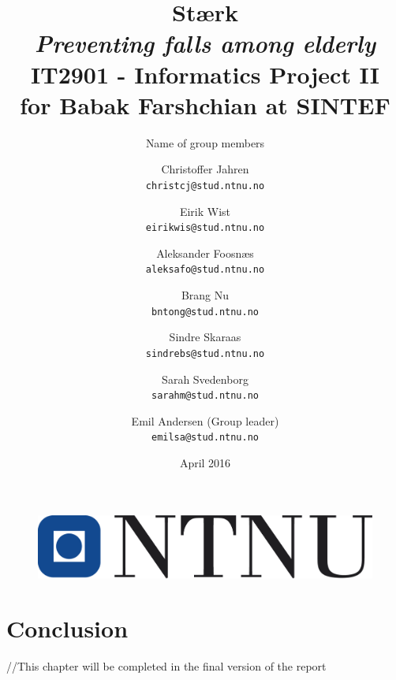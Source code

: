 \documentclass{report}
\title{Stærk \\
\large \textit{Preventing falls among elderly} \\[0.5em] IT2901 - Informatics Project II \\for Babak Farshchian at SINTEF}
\author{Name of group members}
\author{
  Christoffer Jahren\\
  \texttt{christcj@stud.ntnu.no}
  \and
  Eirik Wist\\
  \texttt{eirikwis@stud.ntnu.no}
  \and
  Aleksander Foosnæs\\
  \texttt{aleksafo@stud.ntnu.no}
  \and
  Brang Nu\\
  \texttt{bntong@stud.ntnu.no}
  \and
  Sindre Skaraas\\
  \texttt{sindrebs@stud.ntnu.no}
  \and
  Sarah Svedenborg\\
  \texttt{sarahm@stud.ntnu.no} 
  \and
   Emil Andersen (Group leader)\\
  \texttt{emilsa@stud.ntnu.no} 
}
\date{April 2016}
\begin{document}
\begin{figure}
    \centering
    \includegraphics[scale=0.5]{Figures/ntnulogo}
    \label{fig:ntnulogo}
\end{figure}

\maketitle

\pagebreak

\tableofcontents

\pagebreak

\listoffigures
\listoftables































\chapter{Conclusion}
//This chapter will be completed in the final version of the report






\end{document}
